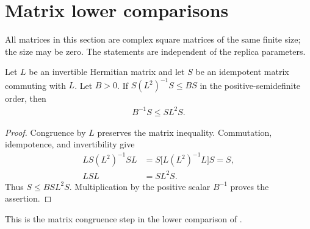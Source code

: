 \section{Matrix lower comparisons}

All matrices in this section are complex square matrices of the same finite
size; the size may be zero. The statements are independent of the replica
parameters.

\begin{theorem}
    \label{thm:area_law_compressed_inverse_floor}
    \leanok
    Let $L$ be an invertible Hermitian matrix and let $S$ be an
    idempotent matrix commuting with $L$. Let $B>0$. If
    $S(L^2)^{-1}S\le BS$ in the positive-semidefinite order, then
    \begin{align}
        B^{-1}S\le SL^2S.
    \end{align}
\end{theorem}

\begin{proof}\leanok
    Congruence by $L$ preserves the matrix inequality. Commutation,
    idempotence, and invertibility give
    \begin{align}
        LS(L^2)^{-1}SL
            & =S\bigl[L(L^2)^{-1}L\bigr]S=S, \\
        LSL & =SL^2S.
    \end{align}
    Thus $S\le BSL^2S$. Multiplication by the positive scalar
    $B^{-1}$ proves the assertion.
\end{proof}

This is the matrix congruence step in the lower comparison of
\cite[Section~7]{OpenAI2026AreaLaw}.
